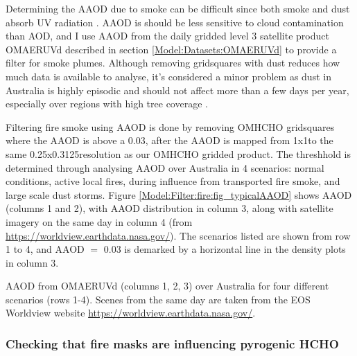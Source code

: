     Determining the AAOD due to smoke can be difficult since both smoke and dust absorb UV radiation \parencite{Ahn2008,Marais2012}.
    AAOD is should be less sensitive to cloud contamination than AOD, and I use AAOD from the daily gridded level 3 satellite product OMAERUVd \parencite{Ahn2008} described in section \ref{Model:Datasets:OMAERUVd} to provide a filter for smoke plumes.
    Although removing gridsquares with dust reduces how much data is available to analyse, it's considered a minor problem as dust in Australia is highly episodic and should not affect more than a few days per year, especially over regions with high tree coverage \parencite{Shao2007}.
    
    Filtering fire smoke using AAOD is done by removing OMHCHO gridsquares where the AAOD is above a 0.03, after the AAOD is mapped from 1x1\degr to the same 0.25x0.3125\degr resolution as our OMHCHO gridded product.
    The threshhold is determined through analysing AAOD over Australia in 4 scenarios: normal conditions, active local fires, during influence from transported fire smoke, and large scale dust storms.
    Figure \ref{Model:Filter:fire:fig_typicalAAOD} shows AAOD (columns 1 and 2), with AAOD distribution in column 3, along with satellite imagery on the same day in column 4 (from \url{https://worldview.earthdata.nasa.gov/}).
    The scenarios listed are shown from row 1 to 4, and AAOD $=$ 0.03 is demarked by a horizontal line in the density plots in column 3.
    
      {AAOD from OMAERUVd (columns 1, 2, 3) over Australia for four different scenarios (rows 1-4). Scenes from the same day are taken from the EOS Worldview website \url{https://worldview.earthdata.nasa.gov/}.}
      {\label{Model:Filter:fire:fig_typicalAAOD}}
  
  
    \subsubsection{Checking that fire masks are influencing pyrogenic HCHO}
      
